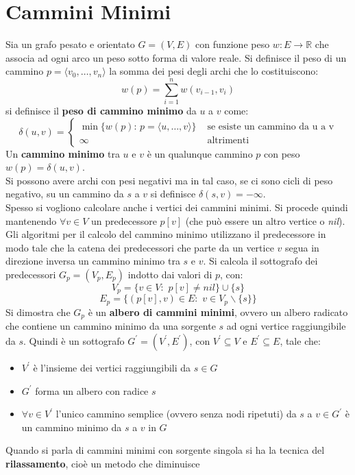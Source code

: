\documentclass[a4paper,12pt, oneside]{book}
\begin{document}
\chapter{Cammini Minimi}
Sia un grafo pesato e orientato $G=(V,E)$ con funzione peso $w:E\to
\mathbb{R}$ che associa ad ogni arco un peso sotto forma di valore
reale. Si definisce il peso di un cammino
$p=\langle v_0,\ldots,v_n\rangle$ la somma dei pesi degli archi che lo
costituiscono:
\[w(p)=\sum_{i=1}^nw(v_{i-1},v_i)\]
si definisce il \textbf{peso di cammino minimo} da $u$ a $v$ come:
\[\delta(u,v)=
  \begin{cases}
    \min\{w(p):\,p=\langle u,\ldots,v\rangle\} & \mbox{ se esiste un
      cammino da u a v}\\
    \infty & \mbox{ altrimenti}
  \end{cases}
\]
Un \textbf{cammino minimo} tra $u$ e $v$ è un qualunque cammino $p$
con peso $w(p)=\delta(u,v)$.\\
Si possono avere archi con pesi negativi ma in tal caso, se ci sono
cicli di peso negativo, su un cammino da $s$ a $v$ si definisce
$\delta(s,v)=-\infty$.\\
Spesso si vogliono calcolare anche i vertici dei cammini minimi. Si
procede quindi mantenendo $\forall v\in V$ un predecessore $p[v]$ (che
può essere un altro vertice o \textit{nil}). Gli algoritmi per il
calcolo del cammino minimo utilizzano il predecessore in modo tale che
la catena dei predecessori che parte da un vertice $v$ segua in
direzione inversa un cammino minimo tra $s$ e $v$. Si calcola il
sottografo dei predecessori $G_p=(V_p,E_p)$ indotto dai valori di $p$,
con:
\[V_p=\{v\in V:\,\,p[v]\neq nil\}\cup \{s\}\]
\[E_p=\{(p[v],v)\in E:\,\,v\in V_p\backslash\{s\}\}\]
Si dimostra che $G_p$ è un \textbf{albero di cammini minimi}, ovvero
un albero radicato che contiene un cammino minimo da una sorgente $s$
ad ogni vertice raggiungibile da $s$. Quindi è un sottografo
$G^{'}=(V^{'},E^{'})$, con $V^{'}\subseteq V$ e $E^{'}\subseteq E$,
tale che:
\begin{itemize}
  \item $V^{'}$ è l'insieme dei vertici raggiungibili da $s\in G$
  \item $G^{'}$ forma un albero con radice $s$
  \item $\forall v\in V^{'}$ l'unico cammino semplice (ovvero senza
  nodi ripetuti) da $s$ a $v\in G^{'}$ è un cammino minimo da $s$ a
  $v$ in $G$
\end{itemize}
Quando si parla di cammini minimi con sorgente singola si ha la
tecnica del \textbf{rilassamento}, cioè un metodo che diminuisce
\end{document}
